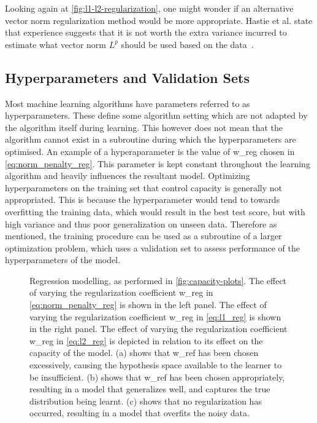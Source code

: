 Looking again at \autoref{fig:l1-l2-regularization}, one might wonder if an
alternative vector norm regularization method would be more appropriate. Hastie
et al. state that experience suggests that it is not worth the extra variance
incurred to estimate what vector norm $L^p$ should be used based on the
data~\cite[p.~73]{hastie2009elements}.

\subsection{Hyperparameters and Validation Sets}
Most machine learning algorithms have parameters referred to as hyperparameters.
These define some algorithm setting which are not adapted by the algorithm
itself during learning. This however does not mean that the algorithm cannot
exist in a subroutine during which the hyperparameters are optimised. An example
of a hyperaparameter is the value of \gls{w_reg} chosen in
\autoref{eq:norm_penalty_reg}. This parameter is kept constant throughout the
learning algorithm and heavily influences the resultant model. Optimizing
hyperparameters on the training set that control capacity is generally not
appropriated. This is because the hyperparameter would tend to towards
overfitting the training data, which would result in the best test score, but
with high variance and thus poor generalization on unseen data. Therefore as
mentioned, the training procedure can be used as a subroutine of a larger
optimization problem, which uses a validation set to assess performance of the
hyperparameters of the model.

\begin{figure}[htp]
    \centering
    
    \captionsetup{format=hang} %
    \caption{
        Regression modelling, as performed in \autoref{fig:capacity-plots}. The
        effect of varying the regularization coefficient \gls{w_reg} in
        \autoref{eq:norm_penalty_reg} is shown in the left panel. The effect of
        varying the regularization coefficient \gls{w_reg} in
        \autoref{eq:l1_reg} is shown in the right panel. The effect of varying
        the regularization coefficient \gls{w_reg} in \autoref{eq:l2_reg} is
        depicted in relation to its effect on the capacity of the model. (a)
        shows that \gls{w_ref} has been chosen excessively, causing the
        hypothesis space available to the learner to be insufficient. (b) shows
        that \gls{w_ref} has been chosen appropriately, resulting in a model
        that generalizes well, and captures the true distribution being learnt.
        (c) shows that no regularization has occurred, resulting in a model that
        overfits the noisy data.
    }
    \label{fig:reg-capacity-plots}
\end{figure}

